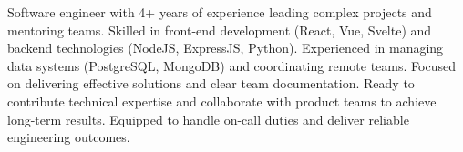 
\begin{cvparagraph}

  Software engineer with 4+ years of experience leading complex projects and mentoring teams. Skilled in front-end development (React, Vue, Svelte) and backend technologies (NodeJS, ExpressJS, Python). Experienced in managing data systems (PostgreSQL, MongoDB) and coordinating remote teams. Focused on delivering effective solutions and clear team documentation. Ready to contribute technical expertise and collaborate with product teams to achieve long-term results. Equipped to handle on-call duties and deliver reliable engineering outcomes.
\end{cvparagraph}

